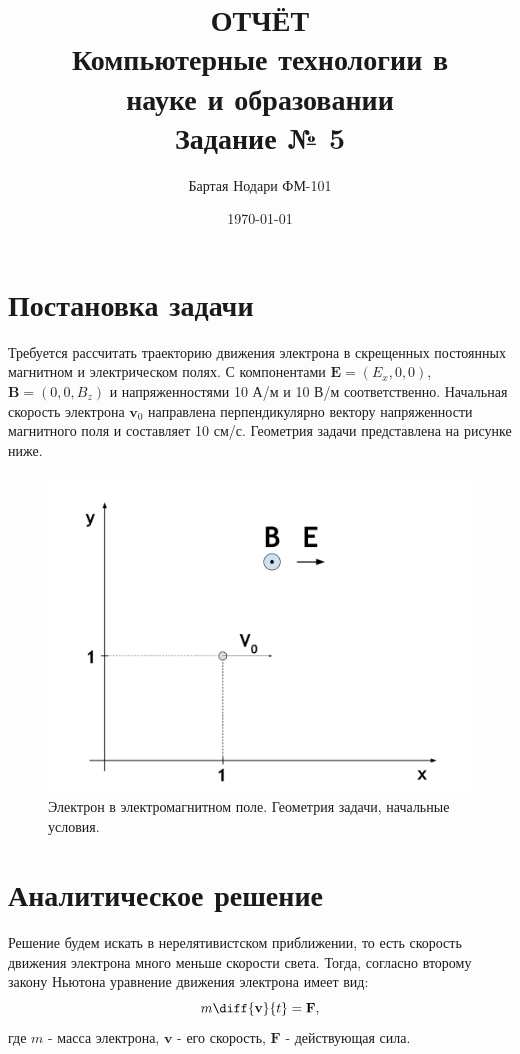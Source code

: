 \documentclass[a4paper]{article}
\author{Бартая Нодари ФМ-101}
\title{ОТЧЁТ\\ Компьютерные технологии в\\ науке и образовании\\ Задание № 5}
\date{\today}
\begin{document}
\maketitle
\newpage
\section{Постановка задачи}

Требуется рассчитать траекторию движения электрона в скрещенных
постоянных магнитном и электрическом полях. 
С компонентами $\mathbf{E}=(E_x, 0, 0)$, $\mathbf{B}=(0, 0, B_z)$ и напряженностями 10 А/м и 10 В/м  соответственно. 
Начальная скорость электрона $\mathbf{v}_0$ направлена перпендикулярно вектору напряженности магнитного поля и составляет 10 см/с.
Геометрия задачи представлена на рисунке ниже.%

\begin{figure}[h]\label{problem}

	\includegraphics[width=\textwidth]{problem.pdf}
	\caption{Электрон в электромагнитном поле. Геометрия задачи, начальные условия.}
\end{figure}

\section{Аналитическое решение}
Решение будем искать в нерелятивистском приближении, то есть скорость движения электрона много меньше скорости света. Тогда, согласно второму закону Ньютона уравнение движения электрона имеет вид:
\begin{equation}\label{motion}
m\diff{\mathbf{v}}{t} = \mathbf{F},
\end{equation}
где $m$ - масса электрона, $\mathbf{v}$ - его скорость, $\mathbf{F}$ - действующая сила.
\end{document}
